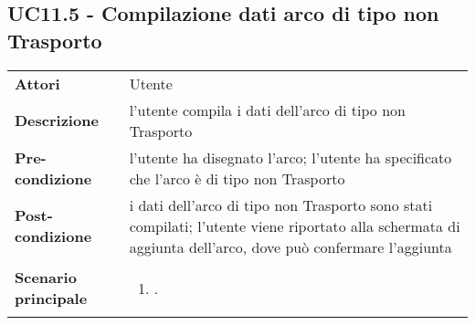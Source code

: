 \subsection{UC11.5 - Compilazione dati arco di tipo non Trasporto} 
\label{sssec:UC11.5} 
\def\arraystretch{1.5}
\begin{tabularx}{\textwidth}{l|p{}}
	\rowcolor{I} \multicolumn{2}{c}{\color{white}\textbf{UC11.5 - Compilazione dati arco di tipo non Trasporto}} \\
	\toprule
	\endhead
	\textbf{Attori} & Utente\\
	\textbf{Descrizione} & l'utente compila i dati dell'arco di tipo non Trasporto\\
	\textbf{Pre-condizione} & l'utente ha disegnato l'arco; l'utente ha specificato che l'arco è di tipo non Trasporto\\
	\textbf{Post-condizione} & i dati dell'arco di tipo non Trasporto sono stati compilati; l'utente viene riportato alla schermata di aggiunta dell'arco, dove può confermare l'aggiunta\\
	\textbf{Scenario principale} & \vspace{-1.2em}\begin{enumerate}[leftmargin=*,noitemsep,nosep]
		\item \nameref{sssec:UC11.5}.
	\end{enumerate}\\
	\bottomrule
\end{tabularx}
